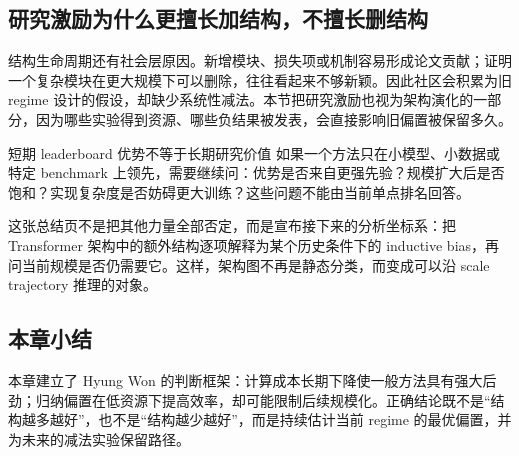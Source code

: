 
\subsection{研究激励为什么更擅长加结构，不擅长删结构}

结构生命周期还有社会层原因。新增模块、损失项或机制容易形成论文贡献；证明一个复杂模块在更大规模下可以删除，往往看起来不够新颖。因此社区会积累为旧 regime 设计的假设，却缺少系统性减法。本节把研究激励也视为架构演化的一部分，因为哪些实验得到资源、哪些负结果被发表，会直接影响旧偏置被保留多久。


\begin{warningbox}{短期 leaderboard 优势不等于长期研究价值}
如果一个方法只在小模型、小数据或特定 benchmark 上领先，需要继续问：优势是否来自更强先验？规模扩大后是否饱和？实现复杂度是否妨碍更大训练？这些问题不能由当前单点排名回答。
\end{warningbox}



这张总结页不是把其他力量全部否定，而是宣布接下来的分析坐标系：把 Transformer 架构中的额外结构逐项解释为某个历史条件下的 inductive bias，再问当前规模是否仍需要它。这样，架构图不再是静态分类，而变成可以沿 scale trajectory 推理的对象。

\subsection{本章小结}

本章建立了 Hyung Won 的判断框架：计算成本长期下降使一般方法具有强大后劲；归纳偏置在低资源下提高效率，却可能限制后续规模化。正确结论既不是“结构越多越好”，也不是“结构越少越好”，而是持续估计当前 regime 的最优偏置，并为未来的减法实验保留路径。

